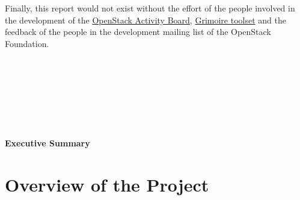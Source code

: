 \documentclass[a4wide,11pt]{report}
\begin{document}
\begin{tabular}{p{5cm}p{10cm}}

\end{tabular}

~~\\
~~\\

Finally, this report would not exist without the effort of the people involved in the development of the \href{https://activity.openstack.org/dash}{OpenStack Activity Board}, \href{http://metricsgrimoire.github.io}{Grimoire toolset} and the feedback of the people in the development mailing list of the OpenStack Foundation.

~~\\
~~\\
~~\\
~~\\
~~\\
~~\\







\newpage

\begin{center}
\textbf{Executive Summary}
\end{center}



\setcounter{tocdepth}{4}
\setcounter{secnumdepth}{4}
\tableofcontents


\chapter{Overview of the Project}
\end{document}
